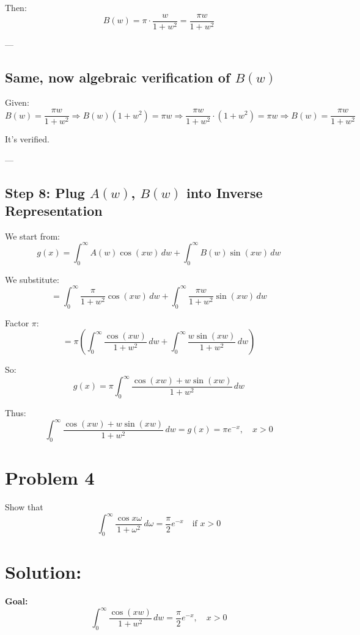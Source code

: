\documentclass{article}
\begin{document}
Then:
\[
B(w) = \pi \cdot \frac{w}{1 + w^2}
= \frac{\pi w}{1 + w^2}
\]

---

\subsection*{Same, now algebraic verification of \( B(w) \)}

Given:
\[
B(w) = \frac{\pi w}{1 + w^2}
\Rightarrow B(w)(1 + w^2) = \pi w
\Rightarrow \frac{\pi w}{1 + w^2} \cdot (1 + w^2) = \pi w
\Rightarrow B(w) = \frac{\pi w}{1 + w^2}
\]

It's verified.

---

\subsection*{Step 8: Plug \( A(w) \), \( B(w) \) into Inverse Representation}

We start from:
\[
g(x) = \int_0^\infty A(w) \cos(xw) \, dw + \int_0^\infty B(w) \sin(xw) \, dw
\]

We substitute:
\[
= \int_0^\infty \frac{\pi}{1 + w^2} \cos(xw) \, dw + \int_0^\infty \frac{\pi w}{1 + w^2} \sin(xw) \, dw
\]

Factor \( \pi \):
\[
= \pi \left( \int_0^\infty \frac{\cos(xw)}{1 + w^2} \, dw + \int_0^\infty \frac{w \sin(xw)}{1 + w^2} \, dw \right)
\]

So:
\[
g(x) = \pi \int_0^\infty \frac{\cos(xw) + w \sin(xw)}{1 + w^2} \, dw
\]

Thus:
\[
\boxed{
\int_0^\infty \frac{\cos(xw) + w \sin(xw)}{1 + w^2} \, dw = g(x) = \pi e^{-x}, \quad x > 0
}
\]


\newpage
\section*{Problem 4}

\noindent
Show that
\[
\int_0^{\infty} \frac{\cos x\omega}{1 + \omega^2} \, d\omega = \frac{\pi}{2} e^{-x} \quad \text{if } x > 0
\]

\vspace{0.5cm}

\section*{Solution:}

\textbf{Goal:}
\[
\boxed{
\int_0^\infty \frac{\cos(xw)}{1 + w^2} \, dw = \frac{\pi}{2} e^{-x}, \quad x > 0
}
\]
\end{document}
